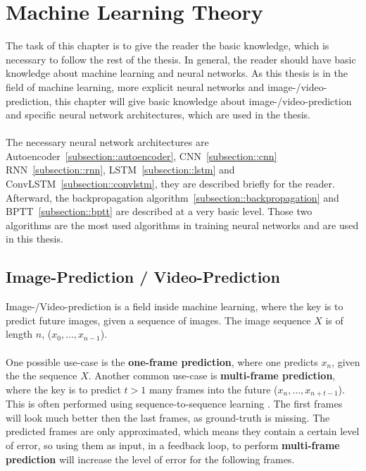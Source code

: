 \section{Machine Learning Theory} \label{section::theory}
 The task of this chapter is to give the reader the basic knowledge, which is necessary to follow the rest of the thesis. In general, the reader should have basic 
 knowledge about machine learning and neural networks.
 As this thesis is in the field of machine learning, more explicit neural networks and image-/video-prediction, this chapter will give basic knowledge about 
 image-/video-prediction
 and specific neural network architectures, which are used in the thesis.\\\\
 The necessary neural network architectures are Autoencoder~\ref{subsection::autoencoder}, CNN~\ref{subsection::cnn} RNN~\ref{subsection::rnn}, 
 LSTM~\ref{subsection::lstm} and ConvLSTM~\ref{subsection::convlstm}, they are described briefly for the reader.
 Afterward, the backpropagation algorithm~\ref{subsection::backpropagation} and BPTT~\ref{subsection::bptt} are described at a very basic level.
 Those two algorithms are the most used algorithms in training neural networks and are used in this thesis.

 \subsection{Image-Prediction / Video-Prediction} \label{subsection::imageprediction}
  Image-/Video-prediction is a field inside machine learning, where the key is to predict future images, given a sequence of images. The image sequence $X$ is of 
  length $n$, ($x_0, \ldots, x_{n-1}$).
  \\\\
  One possible use-case is the \textbf{one-frame prediction}, where one predicts $x_n$, given the the sequence $X$. Another common use-case is \textbf{multi-frame prediction}, where the key is to 
  predict $t > 1$ many frames into the future ($x_n, \ldots, x_{n+t-1}$).
  This is often performed using sequence-to-sequence learning \cite{Sutskever2014}. The first frames will look much better then the last frames, as 
  ground-truth is missing. The predicted frames are only approximated, which means they contain a certain level of error, so using them as input, in a
  feedback loop, to perform \textbf{multi-frame prediction} will increase the level of error for the following frames.

